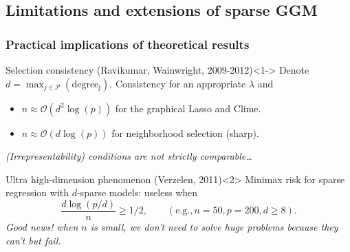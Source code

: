 \begin{frame}
\begin{overlayarea}{\textwidth}{\textheight}
     
\end{overlayarea}      

\end{frame}

\subsection{Limitations and extensions of sparse GGM}

\begin{frame}
  \frametitle{Practical implications of theoretical results}

  \begin{block}{Selection    consistency    (Ravikumar,    Wainwright,
      2009-2012)}<1->                                           Denote
    $d=\max_{j\in\mathcal{P}}(\mathrm{degree_j})$.  Consistency for an
    appropriate $\lambda$ and
    \begin{itemize}
    \item  $n\approx\mathcal{O}(d^2\log(p))$ for  the graphical  Lasso
      and Clime.
    \item $n\approx\mathcal{O}(d\log(p))$  for   neighborhood
      selection (sharp).
    \end{itemize}
    \textit{(Irrepresentability) conditions are not strictly
    comparable\dots}
  \end{block}

  \vfill

  \begin{block}{Ultra high-dimension phenomenon (Verzelen,  2011)}<2>
    Minimax risk for sparse regression with $d$-sparse models: useless
    when
    \begin{equation*}
    \frac{d \log(p/d)}{n} \geq 1/2, \qquad (\mathrm{e.g.}, n=50, p=200, d\geq 8).
    \end{equation*}
    \textit{Good news! when $n$ is small, we don't need to solve
      huge problems because they can't but fail.}
  \end{block}

\end{frame}

